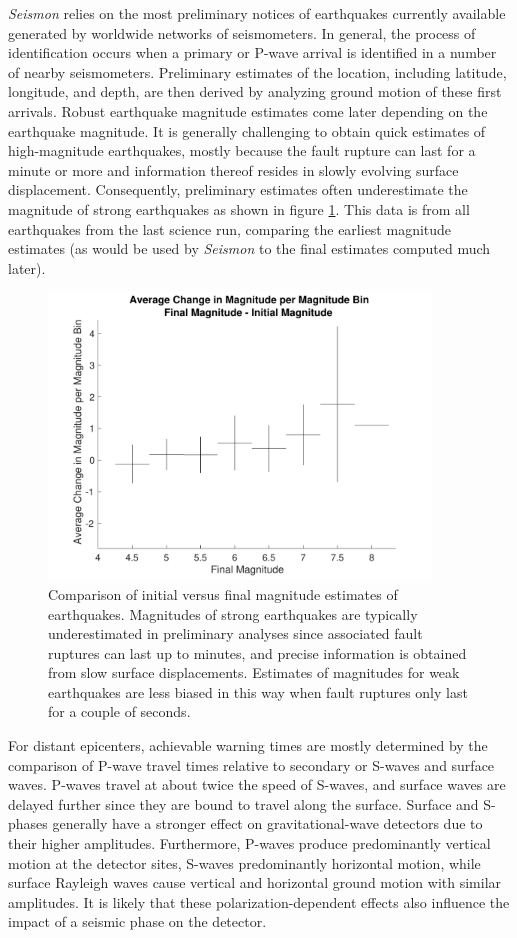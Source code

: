 \documentclass[twocolumn, prl, superscriptaddress]{revtex4}
\begin{document}
\emph{Seismon} relies on the most preliminary notices of earthquakes currently available generated by worldwide networks of seismometers. In general, the process of identification occurs when a primary or P-wave arrival is identified in a number of nearby seismometers. Preliminary estimates of the location, including latitude, longitude, and depth, are then derived by analyzing ground motion of these first arrivals. Robust earthquake magnitude estimates come later depending on the earthquake magnitude. It is generally challenging to obtain quick estimates of high-magnitude earthquakes, mostly because the fault rupture can last for a minute or more and information thereof resides in slowly evolving surface displacement. Consequently, preliminary estimates often underestimate the magnitude of strong earthquakes as shown in figure \ref{fig:initialfinal}. This data is from all earthquakes from the last science run, comparing the earliest magnitude estimates (as would be used by \emph{Seismon} to the final estimates computed much later).
\begin{figure}[t]
\hspace*{-0.5cm}
\centering
\includegraphics[width=4in]{AverageChange.pdf}
\caption{Comparison of initial versus final magnitude estimates of earthquakes. Magnitudes of strong earthquakes are typically underestimated in preliminary analyses since associated fault ruptures can last up to minutes, and precise information is obtained from slow surface displacements. Estimates of magnitudes for weak earthquakes are less biased in this way when fault ruptures only last for a couple of seconds.}
 \label{fig:initialfinal}
 \end{figure}

For distant epicenters, achievable warning times are mostly determined by the comparison of P-wave travel times relative to secondary or S-waves and surface waves. P-waves travel at about twice the speed of S-waves, and surface waves are delayed further since they are bound to travel along the surface. Surface and S-phases generally have a stronger effect on gravitational-wave detectors due to their higher amplitudes. Furthermore, P-waves produce predominantly vertical motion at the detector sites, S-waves predominantly horizontal motion, while surface Rayleigh waves cause vertical and horizontal ground motion with similar amplitudes. It is likely that these polarization-dependent effects also influence the impact of a seismic phase on the detector.
\end{document}
